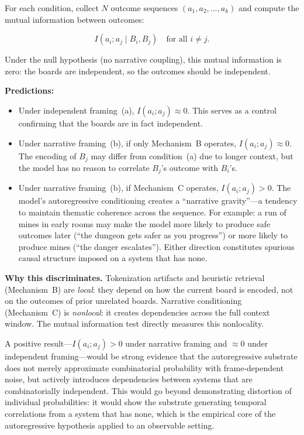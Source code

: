 \documentclass[12pt,a4paper]{article}
\theoremstyle{definition}
\theoremstyle{remark}
\begin{document}
For each condition, collect $N$ outcome sequences
$(a_1, a_2, \ldots, a_k)$ and compute the mutual information between
outcomes:

\begin{equation}\label{eq:mutual-info}
  I(a_i; a_j \mid B_i, B_j) \quad \text{for all } i \neq j.
\end{equation}

Under the null hypothesis (no narrative coupling), this mutual
information is zero: the boards are independent, so the outcomes
should be independent.

\textbf{Predictions:}

\begin{itemize}
  \item Under independent framing~(a), $I(a_i; a_j) \approx 0$.
    This serves as a control confirming that the boards are in fact
    independent.

  \item Under narrative framing~(b), if only Mechanism~B operates,
    $I(a_i; a_j) \approx 0$.  The encoding of $B_j$ may differ
    from condition~(a) due to longer context, but the model has no
    reason to correlate $B_j$'s outcome with $B_i$'s.

  \item Under narrative framing~(b), if Mechanism~C operates,
    $I(a_i; a_j) > 0$.  The model's autoregressive conditioning
    creates a ``narrative gravity''---a tendency to maintain
    thematic coherence across the sequence.  For example: a run of
    mines in early rooms may make the model more likely to produce
    safe outcomes later (``the dungeon gets safer as you progress'')
    or more likely to produce mines (``the danger escalates'').
    Either direction constitutes spurious causal structure imposed
    on a system that has none.
\end{itemize}

\textbf{Why this discriminates.}  Tokenization artifacts and
heuristic retrieval (Mechanism~B) are \emph{local}: they depend on
how the current board is encoded, not on the outcomes of prior
unrelated boards.  Narrative conditioning (Mechanism~C) is
\emph{nonlocal}: it creates dependencies across the full context
window.  The mutual information test directly measures this
nonlocality.

A positive result---$I(a_i; a_j) > 0$ under narrative framing and
$\approx 0$ under independent framing---would be strong evidence
that the autoregressive substrate does not merely approximate
combinatorial probability with frame-dependent noise, but actively
introduces dependencies between systems that are combinatorially
independent.  This would go beyond demonstrating distortion of
individual probabilities: it would show the substrate generating
temporal correlations from a system that has none, which is the
empirical core of the autoregressive hypothesis applied to an
observable setting.
\end{document}
